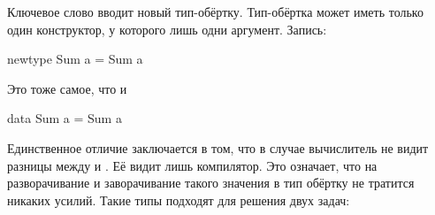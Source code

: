 Ключевое слово  вводит новый тип-обёртку. Тип-обёртка может
иметь только один конструктор, у которого лишь одни аргумент. Запись:


\begin{code}
newtype Sum a = Sum a
\end{code}

Это тоже самое, что и


\begin{code}
data Sum a = Sum a
\end{code}

Единственное отличие заключается в том, что в случае 
вычислитель не видит разницы между  и . Её видит лишь
компилятор. Это означает, что на разворачивание и заворачивание такого
значения в тип обёртку не тратится никаких усилий. Такие типы подходят
для решения двух задач:


